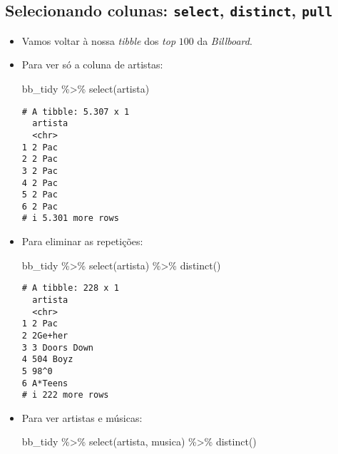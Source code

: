 \documentclass[
  letterpaper,
  DIV=11,
  numbers=noendperiod]{scrreprt}
\newenvironment{Shaded}{\begin{snugshade}}{\end{snugshade}}
\newcommand{\FunctionTok}[1]{\textcolor[rgb]{0.28,0.35,0.67}{#1}}
\newcommand{\NormalTok}[1]{\textcolor[rgb]{0.00,0.23,0.31}{#1}}
\newcommand{\SpecialCharTok}[1]{\textcolor[rgb]{0.37,0.37,0.37}{#1}}
\begin{document}
\subsection{\texorpdfstring{Selecionando colunas: \texttt{select},
\texttt{distinct},
\texttt{pull}}{Selecionando colunas: select, distinct, pull}}\label{selecionando-colunas-select-distinct-pull}

\begin{itemize}
\item
  Vamos voltar à nossa \emph{tibble} dos \emph{top} $100$ da
  \emph{Billboard}.
\item
  Para ver só a coluna de artistas:

\begin{Shaded}
\begin{Highlighting}[]
\NormalTok{bb\_tidy }\SpecialCharTok{\%\textgreater{}\%} 
  \FunctionTok{select}\NormalTok{(artista)}
\end{Highlighting}
\end{Shaded}

\begin{verbatim}
# A tibble: 5.307 x 1
  artista
  <chr>  
1 2 Pac  
2 2 Pac  
3 2 Pac  
4 2 Pac  
5 2 Pac  
6 2 Pac  
# i 5.301 more rows
\end{verbatim}
\item
  Para eliminar as repetições:

\begin{Shaded}
\begin{Highlighting}[]
\NormalTok{bb\_tidy }\SpecialCharTok{\%\textgreater{}\%} 
  \FunctionTok{select}\NormalTok{(artista) }\SpecialCharTok{\%\textgreater{}\%} 
  \FunctionTok{distinct}\NormalTok{()}
\end{Highlighting}
\end{Shaded}

\begin{verbatim}
# A tibble: 228 x 1
  artista     
  <chr>       
1 2 Pac       
2 2Ge+her     
3 3 Doors Down
4 504 Boyz    
5 98^0        
6 A*Teens     
# i 222 more rows
\end{verbatim}
\item
  Para ver artistas e músicas:

\begin{Shaded}
\begin{Highlighting}[]
\NormalTok{bb\_tidy }\SpecialCharTok{\%\textgreater{}\%} 
  \FunctionTok{select}\NormalTok{(artista, musica) }\SpecialCharTok{\%\textgreater{}\%} 
  \FunctionTok{distinct}\NormalTok{()}
\end{Highlighting}
\end{Shaded}


\end{itemize}
\end{document}
